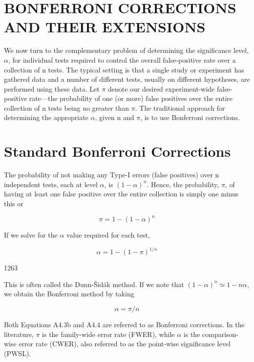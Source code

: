 \documentclass{article}
\begin{document}
\section{BONFERRONI CORRECTIONS AND THEIR EXTENSIONS}
We now turn to the complementary problem of determining the significance level,  $ \alpha $, for individual tests required to control the overall false-positive rate over a collection of n tests. The typical setting is that a single study or experiment has gathered data and a number of different tests, usually on different hypotheses, are performed using these data. Let  $ \pi $ denote our desired experiment-wide false-positive rate—the probability of one (or more) false positives over the entire collection of n tests being no greater than  $ \pi $. The traditional approach for determining the appropriate  $ \alpha $, given n and  $ \pi $, is to use Bonferroni corrections.

\section{Standard Bonferroni Corrections}
The probability of not making any Type-I errors (false positives) over n independent tests, each at level  $ \alpha $, is  $ (1 - \alpha)^n $. Hence, the probability,  $ \pi $, of having at least one false positive over the entire collection is simply one minus this or

\begin{equation}
\pi=1-\left(1-\alpha\right)^{n}
\end{equation}

If we solve for the  $ \alpha $ value required for each test,

\begin{equation}
\alpha=1-(1-\pi)^{1/n}
\end{equation}

1263

This is often called the Dunn-Šidák method. If we note that  $ (1 - \alpha)^n \simeq 1 - n\alpha $, we obtain the Bonferroni method by taking

\begin{equation}
\alpha=\pi/n
\end{equation}

Both Equations A4.3b and A4.4 are referred to as Bonferroni corrections. In the literature,  $ \pi $ is the family-wide error rate (FWER), while  $ \alpha $ is the comparison-wise error rate (CWER), also referred to as the point-wise significance level (PWSL).
\end{document}

